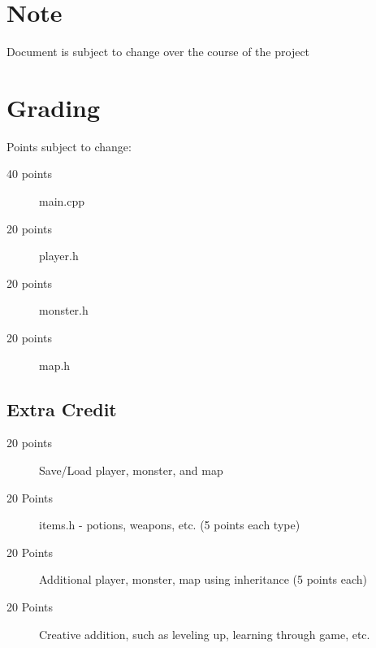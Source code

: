 \documentclass{article}
\begin{document}
\section{Note}
Document is subject to change over the course of the project

\section{Grading}
Points subject to change:
\begin{description}
    \item[40 points] main.cpp
    \item[20 points] player.h
    \item[20 points] monster.h
    \item[20 points] map.h
\end{description}
\subsection{Extra Credit}
\begin{description}
    \item[20 points] Save/Load player, monster, and map
    \item[20 Points] items.h - potions, weapons, etc. (5 points each type)
    \item[20 Points] Additional player, monster, map using inheritance (5 points each)
    \item[20 Points] Creative addition, such as leveling up, learning through game, etc. 
\end{description}
\end{document}
